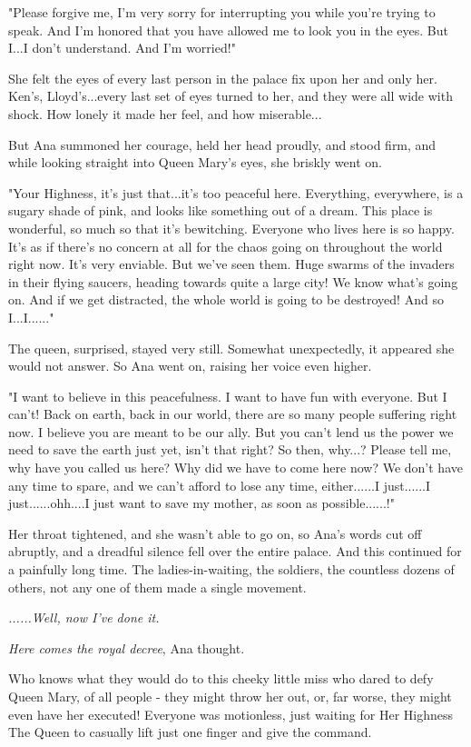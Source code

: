 \documentclass[
]{article}
\begin{document}
"Please forgive me, I'm very sorry for interrupting you while you're
trying to speak. And I'm honored that you have allowed me to look you in
the eyes. But I...I don't understand. And I'm worried!"

She felt the eyes of every last person in the palace fix upon her and
only her. Ken's, Lloyd's...every last set of eyes turned to her, and
they were all wide with shock. How lonely it made her feel, and how
miserable...

But Ana summoned her courage, held her head proudly, and stood firm, and
while looking straight into Queen Mary's eyes, she briskly went on.

"Your Highness, it's just that...it's too peaceful here. Everything,
everywhere, is a sugary shade of pink, and looks like something out of a
dream. This place is wonderful, so much so that it's bewitching.
Everyone who lives here is so happy. It's as if there's no concern at
all for the chaos going on throughout the world right now. It's very
enviable. But we've seen them. Huge swarms of the invaders in their
flying saucers, heading towards quite a large city! We know what's going
on. And if we get distracted, the whole world is going to be destroyed!
And so I...I......"

The queen, surprised, stayed very still. Somewhat unexpectedly, it
appeared she would not answer. So Ana went on, raising her voice even
higher.

"I want to believe in this peacefulness. I want to have fun with
everyone. But I can't! Back on earth, back in our world, there are so
many people suffering right now. I believe you are meant to be our ally.
But you can't lend us the power we need to save the earth just yet,
isn't that right? So then, why...? Please tell me, why have you called
us here? Why did we have to come here now? We don't have any time to
spare, and we can't afford to lose any time, either......I just......I
just......ohh....I just want to save my mother, as soon as
possible......!"

Her throat tightened, and she wasn't able to go on, so Ana's words cut
off abruptly, and a dreadful silence fell over the entire palace. And
this continued for a painfully long time. The ladies-in-waiting, the
soldiers, the countless dozens of others, not any one of them made a
single movement.

\emph{......Well, now I've done it.}

\emph{Here comes the royal decree}, Ana thought.

Who knows what they would do to this cheeky little miss who dared to
defy Queen Mary, of all people - they might throw her out, or, far
worse, they might even have her executed! Everyone was motionless, just
waiting for Her Highness The Queen to casually lift just one finger and
give the command.
\end{document}
